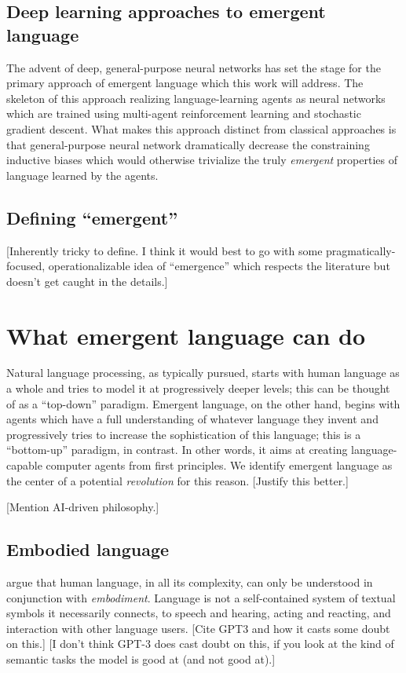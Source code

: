 \documentclass[letterpaper]{report}
\newcommand\bjb[1]{{\color{blue}[#1]}}
\newcommand\cmg[1]{{\color{gray}[#1]}}
\newcommand\drm[1]{{\color{red}[#1]}}
\begin{document}
\subsection{Deep learning approaches to emergent language}
The advent of deep, general-purpose neural networks has set the stage for the primary approach of emergent language which this work will address.
The skeleton of this approach realizing language-learning agents as neural networks which are trained using multi-agent reinforcement learning and stochastic gradient descent.
What makes this approach distinct from classical approaches is that general-purpose neural network dramatically decrease the constraining inductive biases which would otherwise trivialize the truly \emph{emergent} properties of language learned by the agents.

\subsection{Defining ``emergent''}
\bjb{Inherently tricky to define. I think it would best to go with some pragmatically-focused, operationalizable idea of ``emergence'' which respects the literature but doesn't get caught in the details.}

\section{What emergent language can do}
Natural language processing, as typically pursued, starts with human language as a whole and tries to model it at progressively deeper levels; this can be thought of as a ``top-down'' paradigm.
Emergent language, on the other hand, begins with agents which have a full understanding of whatever language they invent and progressively tries to increase the sophistication of this language; this is a ``bottom-up'' paradigm, in contrast.
In other words, it aims at creating language-capable computer agents from first principles.
We identify emergent language as the center of a potential \emph{revolution} for this reason.
\cmg{Justify this better.}

\cmg{Mention AI-driven philosophy.}

\subsection{Embodied language}
\citet{bisk_experience_2020} argue that human language, in all its complexity, can only be understood in conjunction with \emph{embodiment}.
Language is not a self-contained system of textual symbols it necessarily connects, to speech and hearing, acting and reacting, and interaction with other language users.
\cmg{Cite GPT3 and how it casts some doubt on this.} \drm{I don't think GPT-3 does cast doubt on this, if you look at the kind of semantic tasks the model is good at (and not good at).}
\end{document}
